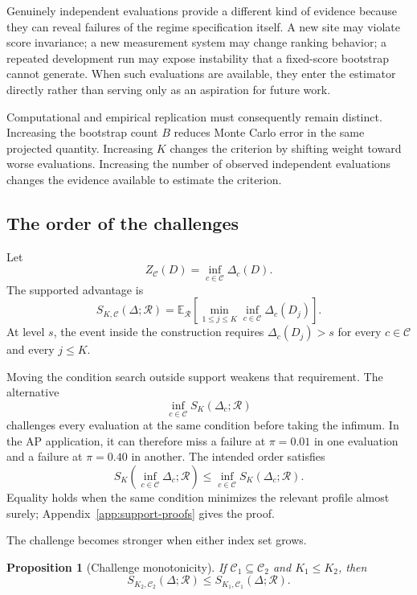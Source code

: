 \documentclass[11pt]{article}
\newcommand{\Regime}{\mathcal{R}}
\newcommand{\CSet}{\mathcal{C}}
\newcommand{\E}{\mathbb{E}}
\newtheorem{proposition}{Proposition}
\theoremstyle{remark}
\begin{document}
Genuinely independent evaluations provide a different kind of evidence because they can reveal failures of the regime specification itself. A new site may violate score invariance; a new measurement system may change ranking behavior; a repeated development run may expose instability that a fixed-score bootstrap cannot generate. When such evaluations are available, they enter the estimator directly rather than serving only as an aspiration for future work.

Computational and empirical replication must consequently remain distinct. Increasing the bootstrap count $B$ reduces Monte Carlo error in the same projected quantity. Increasing $K$ changes the criterion by shifting weight toward worse evaluations. Increasing the number of observed independent evaluations changes the evidence available to estimate the criterion.

\subsection{The order of the challenges}

Let
\[
Z_{\CSet}(D)
=
\inf_{c\in\CSet}\Delta_c(D).
\]
The supported advantage is
\begin{equation}
S_{K,\CSet}(\Delta;\Regime)
=
\E_{\Regime}
\left[
\min_{1\leq j\leq K}
\inf_{c\in\CSet}\Delta_c(D_j)
\right].
\label{eq:robust-support}
\end{equation}
At level $s$, the event inside the construction requires $\Delta_c(D_j)>s$ for every $c\in\CSet$ and every $j\leq K$.

Moving the condition search outside support weakens that requirement. The alternative
\[
\inf_{c\in\CSet}S_K(\Delta_c;\Regime)
\]
challenges every evaluation at the same condition before taking the infimum. In the AP application, it can therefore miss a failure at $\pi=0.01$ in one evaluation and a failure at $\pi=0.40$ in another. The intended order satisfies
\begin{equation}
S_K\left(
\inf_{c\in\CSet}\Delta_c;\Regime
\right)
\leq
\inf_{c\in\CSet}
S_K(\Delta_c;\Regime).
\label{eq:order}
\end{equation}
Equality holds when the same condition minimizes the relevant profile almost surely; Appendix~\ref{app:support-proofs} gives the proof.

The challenge becomes stronger when either index set grows.

\begin{proposition}[Challenge monotonicity]
\label{prop:monotonicity}
If $\mathcal C_1\subseteq\mathcal C_2$ and $K_1\leq K_2$, then
\[
S_{K_2,\mathcal C_2}(\Delta;\Regime)
\leq
S_{K_1,\mathcal C_1}(\Delta;\Regime).
\]
\end{proposition}
\end{document}
